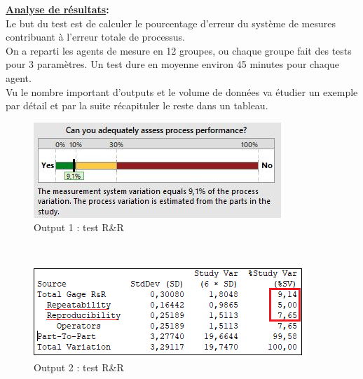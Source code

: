 \documentclass[12pt, a4paper]{thesis}
\begin{document}
\textbf{\underline{Analyse de résultats}:}\\
Le but du test est de calculer le pourcentage d'erreur du système de mesures contribuant à l'erreur totale de processus.\\
On a reparti les agents de mesure en 12 groupes, ou chaque groupe fait des tests pour 3 paramètres. Un test dure en moyenne environ 45 minutes pour chaque agent.\\ 
Vu le nombre important d'outputs et le volume de données va étudier un exemple par détail et par la suite récapituler le reste dans un tableau.\\
\begin{figure}[!h]
\begin{center}
\includegraphics[scale=1]{bgrrtt.JPG}
\caption{Output 1 : test R\&R}
\end{center}
\end{figure}\\

\begin{figure}[!h]
\begin{center}
\includegraphics[scale=1]{utrrtt.png}
\caption{Output 2 : test R\&R}
\end{center}
\end{figure}\\

\\
\end{document}
